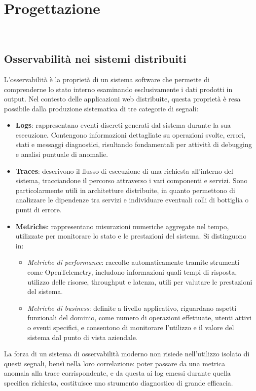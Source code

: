 \chapter{Progettazione}
\label{cap:progettazione}

\\

\section{Osservabilità nei sistemi distribuiti}

L'osservabilità è la proprietà di un sistema software che permette di comprenderne
lo stato interno esaminando esclusivamente i dati prodotti in output. Nel contesto delle
applicazioni web distribuite, questa proprietà è resa possibile dalla produzione
sistematica di tre categorie di segnali:
\begin{itemize}
      \item \textbf{Logs}: rappresentano eventi discreti generati dal sistema durante la sua esecuzione. Contengono informazioni dettagliate su operazioni svolte, errori, stati e messaggi diagnostici, risultando fondamentali per attività di debugging e analisi puntuale di anomalie.

      \item \textbf{Traces}: descrivono il flusso di esecuzione di una richiesta all’interno del sistema, tracciandone il percorso attraverso i vari componenti e servizi. Sono particolarmente utili in architetture distribuite, in quanto permettono di analizzare le dipendenze tra servizi e individuare eventuali colli di bottiglia o punti di errore.

      \item \textbf{Metriche}: rappresentano misurazioni numeriche aggregate nel tempo, utilizzate per monitorare lo stato e le prestazioni del sistema. Si distinguono in:
            \begin{itemize}
                  \item \textit{Metriche di performance}: raccolte automaticamente tramite strumenti come OpenTelemetry, includono informazioni quali tempi di risposta, utilizzo delle risorse, throughput e latenza, utili per valutare le prestazioni del sistema.
                  \item \textit{Metriche di business}: definite a livello applicativo, riguardano aspetti funzionali del dominio, come numero di operazioni effettuate, utenti attivi o eventi specifici, e consentono di monitorare l’utilizzo e il valore del sistema dal punto di vista aziendale.
            \end{itemize}

\end{itemize}
La forza di un sistema di osservabilità moderno non risiede nell'utilizzo isolato di
questi segnali, bensì nella loro correlazione: poter passare da una metrica
anomala alla trace corrispondente, e da questa ai log emessi durante quella specifica
richiesta, costituisce uno strumento diagnostico di grande efficacia.

